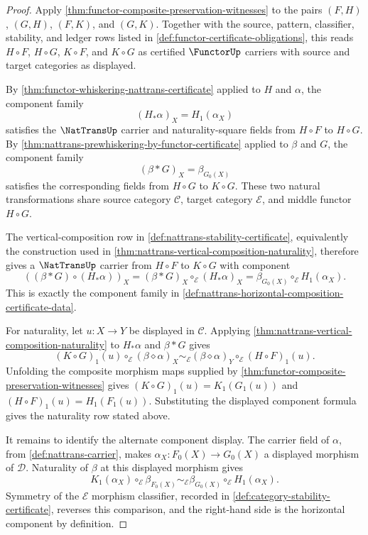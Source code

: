 \begin{proof}
Apply \autoref{thm:functor-composite-preservation-witnesses} to the pairs $(F,H)$, $(G,H)$, $(F,K)$, and $(G,K)$. Together with the source, pattern, classifier, stability, and ledger rows listed in \autoref{def:functor-certificate-obligations}, this reads $H\circ F$, $H\circ G$, $K\circ F$, and $K\circ G$ as certified $\FunctorUp$ carriers with source and target categories as displayed.

By \autoref{thm:functor-whiskering-nattrans-certificate} applied to $H$ and $\alpha$, the component family
$$
(H_{\ast}\alpha)_X=H_1(\alpha_X)
$$
satisfies the $\NatTransUp$ carrier and naturality-square fields from $H\circ F$ to $H\circ G$. By \autoref{thm:nattrans-prewhiskering-by-functor-certificate} applied to $\beta$ and $G$, the component family
$$
(\beta\ast G)_X=\beta_{G_0(X)}
$$
satisfies the corresponding fields from $H\circ G$ to $K\circ G$. These two natural transformations share source category $\mathcal C$, target category $\mathcal E$, and middle functor $H\circ G$.

The vertical-composition row in \autoref{def:nattrans-stability-certificate}, equivalently the construction used in \autoref{thm:nattrans-vertical-composition-naturality}, therefore gives a $\NatTransUp$ carrier from $H\circ F$ to $K\circ G$ with component
$$
((\beta\ast G)\circ(H_{\ast}\alpha))_X
=(\beta\ast G)_X\circ_{\mathcal E}(H_{\ast}\alpha)_X
=\beta_{G_0(X)}\circ_{\mathcal E}H_1(\alpha_X).
$$
This is exactly the component family in \autoref{def:nattrans-horizontal-composition-certificate-data}.

For naturality, let $u:X\to Y$ be displayed in $\mathcal C$. Applying \autoref{thm:nattrans-vertical-composition-naturality} to $H_{\ast}\alpha$ and $\beta\ast G$ gives
$$
(K\circ G)_1(u)\circ_{\mathcal E}(\beta\diamond\alpha)_X
\sim_{\mathcal E}
(\beta\diamond\alpha)_Y\circ_{\mathcal E}(H\circ F)_1(u).
$$
Unfolding the composite morphism maps supplied by \autoref{thm:functor-composite-preservation-witnesses} gives $(K\circ G)_1(u)=K_1(G_1(u))$ and $(H\circ F)_1(u)=H_1(F_1(u))$. Substituting the displayed component formula gives the naturality row stated above.

It remains to identify the alternate component display. The carrier field of $\alpha$, from \autoref{def:nattrans-carrier}, makes $\alpha_X:F_0(X)\to G_0(X)$ a displayed morphism of $\mathcal D$. Naturality of $\beta$ at this displayed morphism gives
$$
K_1(\alpha_X)\circ_{\mathcal E}\beta_{F_0(X)}
\sim_{\mathcal E}
\beta_{G_0(X)}\circ_{\mathcal E}H_1(\alpha_X).
$$
Symmetry of the $\mathcal E$ morphism classifier, recorded in \autoref{def:category-stability-certificate}, reverses this comparison, and the right-hand side is the horizontal component by definition.
\end{proof}

